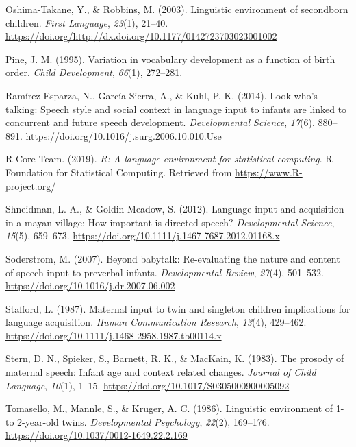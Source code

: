 \documentclass[
  english,
  man,floatsintext]{apa6}
\begin{document}
\leavevmode\hypertarget{ref-oshima-takane_linguistic_2003}{}%
Oshima-Takane, Y., \& Robbins, M. (2003). Linguistic environment of secondborn children. \emph{First Language}, \emph{23}(1), 21--40. \url{https://doi.org/http://dx.doi.org/10.1177/0142723703023001002}

\leavevmode\hypertarget{ref-pine_variation_1995}{}%
Pine, J. M. (1995). Variation in vocabulary development as a function of birth order. \emph{Child Development}, \emph{66}(1), 272--281.

\leavevmode\hypertarget{ref-ramirez-esparza_look_2014}{}%
Ramírez-Esparza, N., García-Sierra, A., \& Kuhl, P. K. (2014). Look who's talking: Speech style and social context in language input to infants are linked to concurrent and future speech development. \emph{Developmental Science}, \emph{17}(6), 880--891. \url{https://doi.org/10.1016/j.surg.2006.10.010.Use}

\leavevmode\hypertarget{ref-r_core_team_r_2019}{}%
R Core Team. (2019). \emph{R: A language environment for statistical computing}. R Foundation for Statistical Computing. Retrieved from \url{https://www.R-project.org/}

\leavevmode\hypertarget{ref-shneidman_language_2012}{}%
Shneidman, L. A., \& Goldin‐Meadow, S. (2012). Language input and acquisition in a mayan village: How important is directed speech? \emph{Developmental Science}, \emph{15}(5), 659--673. \url{https://doi.org/10.1111/j.1467-7687.2012.01168.x}

\leavevmode\hypertarget{ref-soderstrom_beyond_2007}{}%
Soderstrom, M. (2007). Beyond babytalk: Re-evaluating the nature and content of speech input to preverbal infants. \emph{Developmental Review}, \emph{27}(4), 501--532. \url{https://doi.org/10.1016/j.dr.2007.06.002}

\leavevmode\hypertarget{ref-stafford_maternal_1987}{}%
Stafford, L. (1987). Maternal input to twin and singleton children implications for language acquisition. \emph{Human Communication Research}, \emph{13}(4), 429--462. \url{https://doi.org/10.1111/j.1468-2958.1987.tb00114.x}

\leavevmode\hypertarget{ref-stern_prosody_1983}{}%
Stern, D. N., Spieker, S., Barnett, R. K., \& MacKain, K. (1983). The prosody of maternal speech: Infant age and context related changes. \emph{Journal of Child Language}, \emph{10}(1), 1--15. \url{https://doi.org/10.1017/S0305000900005092}

\leavevmode\hypertarget{ref-tomasello_linguistic_1986}{}%
Tomasello, M., Mannle, S., \& Kruger, A. C. (1986). Linguistic environment of 1- to 2-year-old twins. \emph{Developmental Psychology}, \emph{22}(2), 169--176. \url{https://doi.org/10.1037/0012-1649.22.2.169}
\end{document}
